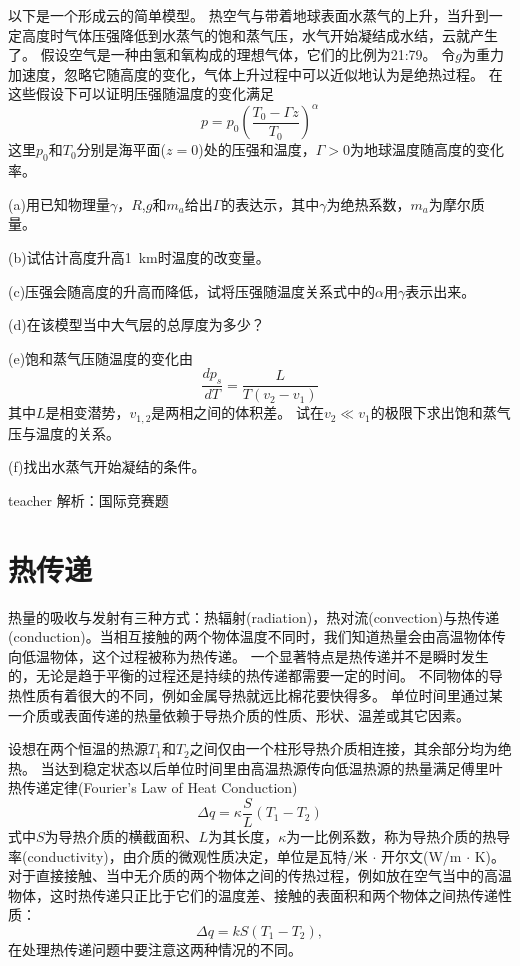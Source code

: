 \begin{example}
以下是一个形成云的简单模型。
热空气与带着地球表面水蒸气的上升，当升到一定高度时气体压强降低到水蒸气的饱和蒸气压，水气开始凝结成水结，云就产生了。
假设空气是一种由氢和氧构成的理想气体，它们的比例为21:79。
令$g$为重力加速度，忽略它随高度的变化，气体上升过程中可以近似地认为是绝热过程。
在这些假设下可以证明压强随温度的变化满足
\[
p=p_0\left(\frac{T_0-\Gamma z}{T_0}\right)^\alpha
\]
这里$p_0$和$T_0$分别是海平面($z=0$)处的压强和温度，$\Gamma>0$为地球温度随高度的变化率。

(a)用已知物理量$\gamma$，$R$,$g$和$m_a$给出$\Gamma$的表达示，其中$\gamma$为绝热系数，$m_a$为摩尔质量。

(b)试估计高度升高\SI{1}{km}时温度的改变量。

(c)压强会随高度的升高而降低，试将压强随温度关系式中的$\alpha$用$\gamma$表示出来。

(d)在该模型当中大气层的总厚度为多少？

(e)饱和蒸气压随温度的变化由
\[
\frac{dp_s}{dT}=\frac{L}{T(v_2-v_1)}
\]
其中$L$是相变潜势，$v_{1,2}$是两相之间的体积差。
试在$v_2\ll v_1$的极限下求出饱和蒸气压与温度的关系。


(f)找出水蒸气开始凝结的条件。


\begin{taggedblock}{teacher}
\noindent
解析：国际竞赛题
\end{taggedblock}
\end{example}




\section{热传递}
热量的吸收与发射有三种方式：{\heiti 热辐射}(radiation)，{\heiti 热对流}(convection)与{\heiti 热传递}(conduction)。当相互接触的两个物体温度不同时，我们知道热量会由高温物体传向低温物体，这个过程被称为热传递。
一个显著特点是热传递并不是瞬时发生的，无论是趋于平衡的过程还是持续的热传递都需要一定的时间。
不同物体的导热性质有着很大的不同，例如金属导热就远比棉花要快得多。
单位时间里通过某一介质或表面传递的热量依赖于导热介质的性质、形状、温差或其它因素。

设想在两个恒温的热源$T_1$和$T_2$之间仅由一个柱形导热介质相连接，其余部分均为绝热。
当达到稳定状态以后单位时间里由高温热源传向低温热源的热量满足{\heiti 傅里叶热传递定律}(Fourier's Law of Heat Conduction)
\begin{equation}
\Delta q = \kappa \frac{S}{L}(T_1-T_2)
\end{equation}
式中$S$为导热介质的横截面积、$L$为其长度，$\kappa$为一比例系数，称为导热介质的{\heiti 热导率}(conductivity)，由介质的微观性质决定，单位是瓦特/米 $\cdot$ 开尔文(W/m $\cdot$ K)。
对于直接接触、当中无介质的两个物体之间的传热过程，例如放在空气当中的高温物体，这时热传递只正比于它们的温度差、接触的表面积和两个物体之间热传递性质：
\begin{equation}
\Delta q = k S (T_1-T_2),
\end{equation}
在处理热传递问题中要注意这两种情况的不同。

